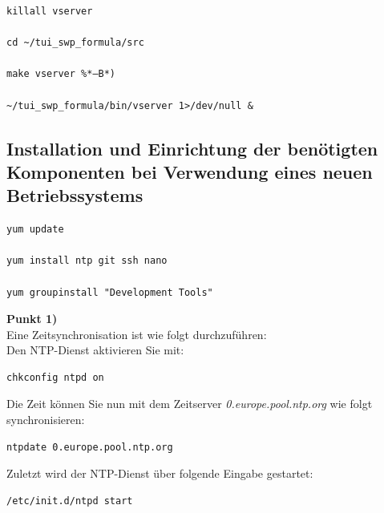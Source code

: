 \documentclass[fontsize = 12pt, paper = a4]{scrreprt}
\begin{document}
\vspace*{4mm}
\begin{lstlisting}[frame=single]
killall vserver

cd ~/tui_swp_formula/src
	
make vserver %*–B*)

~/tui_swp_formula/bin/vserver 1>/dev/null &
\end{lstlisting} 
\vspace*{-2mm}

\subsection{Installation und Einrichtung der benötigten Komponenten bei Verwendung eines neuen Betriebssystems}

\vspace*{4mm}
\begin{lstlisting}[frame=single]
yum update

yum install ntp git ssh nano

yum groupinstall "Development Tools"
\end{lstlisting} 
\vspace*{-2mm}

\textbf{Punkt 1)} \\

Eine Zeitsynchronisation ist wie folgt durchzuführen: \\
Den NTP-Dienst aktivieren Sie mit: 

\vspace*{4mm}
\begin{lstlisting}[frame=single]
chkconfig ntpd on
\end{lstlisting} 
\vspace*{-2mm}

\newpage

Die Zeit können Sie nun mit dem Zeitserver \textit{0.europe.pool.ntp.org} wie folgt synchronisieren:

\vspace*{4mm}
\begin{lstlisting}[frame=single]
ntpdate 0.europe.pool.ntp.org
\end{lstlisting} 
\vspace*{-2mm}

Zuletzt wird der NTP-Dienst über folgende Eingabe gestartet: 

\vspace*{4mm}
\begin{lstlisting}[frame=single]
/etc/init.d/ntpd start
\end{lstlisting} 
\vspace*{-2mm}
\end{document}
